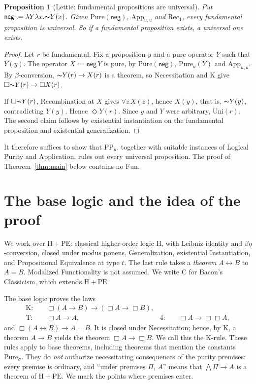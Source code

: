 \documentclass[12pt,leqno]{article}
\newcommand{\IFF}{\ensuremath{\leftrightarrow}}
\newcommand{\IC}{\ensuremath{\rightarrow}}
\newcommand{\NOT}{\ensuremath{\text{$\thicksim$}}}
\newcommand{\Pure}{\ensuremath{\mathrm{Pure}}}
\newcommand{\Fun}{\ensuremath{\mathrm{Fun}}}
\newcommand{\Uni}{\ensuremath{\mathrm{Uni}}}
\newcommand{\PPu}{\ensuremath{\mathrm{PP}_u}}
\newcommand{\HPE}{\ensuremath{\mathrm{H}+\mathrm{PE}}}
\newcommand{\App}{\ensuremath{\mathrm{App}}}
\newcommand{\Rec}{\ensuremath{\mathrm{Rec}_1}}
\newcommand{\negop}{\ensuremath{\mathsf{neg}}}
\theoremstyle{plain}
\newtheorem*{proposition}{Proposition}
\begin{document}
\begin{proposition}[Lettie: fundamental propositions are universal]
Put \(\negop:=\lambda Y\lambda x.\NOT Y(x)\). Given \(\Pure(\negop)\),
\(\App_{u,u}\) and \(\Rec\), every fundamental proposition is universal.
So if a fundamental proposition exists, a universal one exists.
\end{proposition}
\begin{proof}
Let \(r\) be fundamental. Fix a proposition \(y\) and a pure operator
\(Y\) such that \(Y(y)\). The operator \(X:=\negop\,Y\) is pure, by
\(\Pure(\negop)\), \(\Pure_u(Y)\) and \(\App_{u,u}\). By
\(\beta\)-conversion, \(\NOT Y(r)\IC X(r)\) is a theorem, so
Necessitation and K give \(\Box\NOT Y(r)\IC\Box X(r)\).

If \(\Box\NOT Y(r)\), Recombination at \(X\) gives \(\forall z\,X(z)\),
hence \(X(y)\), that is, \(\NOT Y(y)\), contradicting \(Y(y)\). Hence
\(\Diamond Y(r)\). Since \(y\) and \(Y\) were arbitrary, \(\Uni(r)\).
The second claim follows by existential instantiation on the
fundamental proposition and existential generalization.
\end{proof}

It therefore suffices to show that \(\PPu\), together with suitable
instances of Logical Purity and Application, rules out every universal
proposition. The proof of Theorem~\ref{thm:main} below contains no
\(\Fun\).

\section{The base logic and the idea of the proof}

We work over \HPE: classical higher-order logic H, with Leibniz identity
and \(\beta\eta\)-conversion, closed under modus ponens, Generalization,
existential Instantiation, and Propositional Equivalence at type \(t\).
The last rule takes a \emph{theorem} \(A\IFF B\) to \(A=B\). Modalized
Functionality is not assumed. We write C for Bacon's Classicism, which
extends \HPE.

The base logic proves the laws
\[
 \begin{aligned}
 \mathrm{K}:&\quad \Box(A\IC B)\IC(\Box A\IC\Box B),\\
 \mathrm{T}:&\quad \Box A\IC A,
 &\mathrm{4}:&\quad \Box A\IC\Box\Box A,
 \end{aligned}
\]
and \(\Box(A\IFF B)\IC A=B\). It is closed under Necessitation; hence,
by K, a theorem \(A\IC B\) yields the theorem \(\Box A\IC\Box B\). We call this the K-rule. These rules
apply to base theorems, including theorems that mention the constants
\(\Pure_\sigma\). They do \emph{not} authorize necessitating
consequences of the purity premises: every premise is ordinary, and
``under premises \(\Pi\), \(A\)'' means that \(\bigwedge\Pi\IC A\) is a
theorem of \HPE. We mark the points where premises enter.
\end{document}
